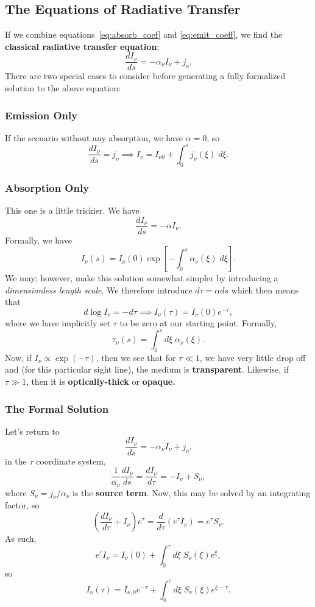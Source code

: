 \subsection{The Equations of Radiative Transfer}

If we combine equations~\ref{eq:absorb_coef} and \ref{eq:emit_coeff}, we find the \textbf{classical radiative transfer equation}:
\begin{equation}
    \label{eq:radiative_transfer}
    \frac{dI_\nu}{ds} = -\alpha_\nu I_\nu + j_\nu.
\end{equation}
There are two special cases to consider before generating a fully formalized solution to the above equation:

\subsubsection*{Emission Only}
If the scenario without any absorption, we have $\alpha = 0$, so
\[
\boxed{
\frac{dI_\nu}{ds} = j_\nu \implies I_\nu = I_{\nu0} + \int_0^s j_\nu(\xi) \;d\xi.
}
\]
\subsubsection*{Absorption Only}
This one is a little trickier. We have
\[
\frac{dI_\nu}{ds} = -\alpha I_\nu.
\]
Formally, we have
\[
I_\nu(s) = I_\nu(0) \exp\left[-\int_0^s \alpha_\nu(\xi)\;d\xi\right].
\]
We may; however, make this solution somewhat simpler by introducing a \textit{dimensionless length scale}. We therefore introduce $d\tau = \alpha ds$ which then means that
\[
d\log I_\nu = -d\tau \implies I_\nu(\tau) = I_\nu(0) e^{-\tau},
\]
where we have implicitly set $\tau$ to be zero at our starting point. Formally,
\begin{equation}
    \label{eq:optical_depth}
    \boxed{
    \tau_\nu(s) = \int_0^s d\xi\; \alpha_\nu(\xi).
    }
\end{equation}
Now, if $I_\nu \propto \exp(-\tau)$, then we see that for $\tau \ll 1$, we have very little drop off and (for this particular sight line), the medium is \textbf{transparent}. Likewise, if $\tau \gg 1$, then it is \textbf{optically-thick} or \textbf{opaque.}

\subsubsection*{The Formal Solution}
Let's return to
\[
\frac{dI_\nu}{ds} = -\alpha_\nu I_\nu + j_\nu.
\]
in the $\tau$ coordinate system,
\[
\frac{1}{\alpha_\nu} \frac{dI_\nu}{ds} = \frac{dI_\nu}{d\tau} = -I_\nu + S_\nu,
\]
where $S_\nu = j_\nu/\alpha_\nu$ is the \textbf{source term}. Now, this may be solved by an integrating factor, so
\[
\left(\frac{dI_\nu}{d\tau} + I_\nu\right)e^\tau = \frac{d}{d\tau} \left(e^\tau I_\nu\right) = e^\tau S_\nu.
\]
As such,
\[
e^\tau I_\nu = I_\nu(0) +\int_0^\tau d\xi \;S_\nu(\xi) e^\xi, 
\]
so
\[
\boxed{
I_\nu(\tau) = I_{\nu,0}e^{-\tau} + \int_0^\tau d\xi \; S_\nu(\xi) e^{\xi-\tau}.
}
\]
